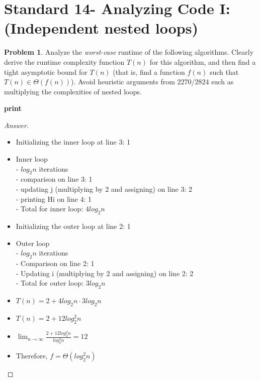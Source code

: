 \documentclass[11pt]{article}
\theoremstyle{definition}
\theoremstyle{definition}
\newtheorem{required}{Problem}
\theoremstyle{definition}
\begin{document}
\newpage
\section{Standard 14- Analyzing Code I: (Independent nested loops)}
\begin{required}


Analyze the \textit{worst-case} runtime of the following algorithms. Clearly derive the runtime complexity function $T(n)$ for this algorithm, and then find a tight asymptotic bound for $T(n)$ (that is, find a function $f(n)$ such that $T(n) \in \Theta(f(n))$). Avoid heuristic arguments from 2270/2824 such as multiplying the complexities of nested loops.



\begin{algorithm}
\caption{Nested Algorithm 1}\label{alg:Nested2}
\begin{algorithmic}[1]
		\State \textbf{print} 
	\EndFor
\EndFor
\EndProcedure
\end{algorithmic}
\end{algorithm}
\begin{proof}[Answer] $ $ \\

\begin{itemize}
    \item Initializing the inner loop at line 3: 1 
    \item Inner loop \\
    - $log_2n$ iterations \\
    - comparison on line 3: 1 \\
    - updating j (multiplying by 2 and assigning) on line 3: 2 \\
    - printing Hi on line 4: 1 \\
    - Total for inner loop: $4log_2n$ 
    \item Initializing the outer loop at line 2: 1 
    \item Outer loop \\
    - $log_2n$ iterations \\
    - Comparison on line 2: 1 \\
    - Updating i (multiplying by 2 and assigning) on line 2: 2 \\
    - Total for outer loop: $3log_2n$ 
    \item $T(n) = 2 + 4log_2n \cdot 3log_2n$
    \item $T(n) = 2 + 12log^2_2n$ \\ 
    \item $\lim_{n \to \infty} \frac{2 + 12log^2_2n}{log^2_2n} = 12$ \\ 
    \item Therefore, $f = \Theta(log^2_2n)$
\end{itemize}

\end{proof}
\end{required}
\end{document}
